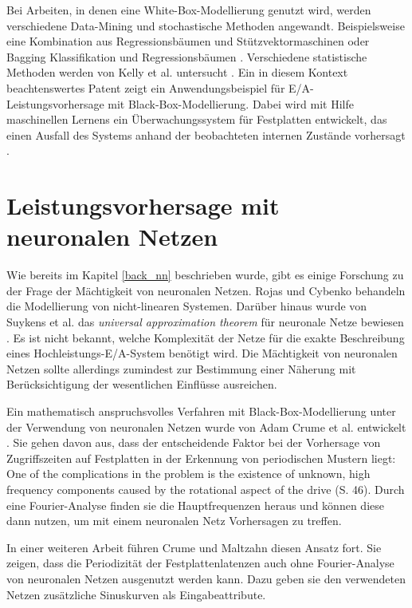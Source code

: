 \documentclass[
	twoside,
	12pt,
	a4paper,
	BCOR10mm,
	DIV14,
	listof=totoc,
	bibliography=totoc,
	headsepline
]{scrreprt}
\begin{document}
Bei Arbeiten, in denen eine White-Box-Modellierung genutzt wird, werden verschiedene Data-Mining und stochastische Methoden angewandt. Beispielsweise eine Kombination aus Regressionsbäumen und Stützvektormaschinen \cite{Dai:2012:SDP:2477169.2477214} oder Bagging Klassifikation und Regressionsbäumen \cite{DBLP:conf/npc/ZhangLZJC10}. Verschiedene statistische Methoden werden von Kelly et al. untersucht \cite{Kelly04inducingmodels}.
Ein in diesem Kontext beachtenswertes Patent zeigt ein Anwendungsbeispiel für E/A-Leistungsvorhersage mit Black-Box-Modellierung. Dabei wird mit Hilfe maschinellen Lernens ein Überwachungssystem für Festplatten entwickelt, das einen Ausfall des Systems anhand der beobachteten internen Zustände vorhersagt \cite{gough2012predicting}. 

\section{Leistungsvorhersage mit neuronalen Netzen}
\label{rel_vorhersage-mit-nn}
Wie bereits im Kapitel \ref{back_nn} beschrieben wurde, gibt es einige Forschung zu der Frage der Mächtigkeit von neuronalen Netzen. Rojas \cite{Rojas:1996:NNS:235222} und  Cybenko \cite{cybenko:mcss} behandeln die Modellierung von nicht-linearen Systemen. Darüber hinaus wurde von Suykens et al. das \textit{universal approximation theorem} für neuronale Netze bewiesen \cite{suykens2012artificial}. Es ist nicht bekannt, welche Komplexität der Netze für die exakte Beschreibung eines Hochleistungs-E/A-System benötigt wird. Die Mächtigkeit von neuronalen Netzen sollte allerdings zumindest zur Bestimmung einer Näherung mit Berücksichtigung der wesentlichen Einflüsse ausreichen.

Ein mathematisch anspruchsvolles Verfahren mit Black-Box-Modellierung unter der Verwendung von neuronalen Netzen wurde von Adam Crume et al. entwickelt \cite{Crume:2013:FML:2538542.2538561}. Sie gehen davon aus, dass der entscheidende Faktor bei der Vorhersage von Zugriffszeiten auf Festplatten in der Erkennung von periodischen Mustern liegt: \glqq One of the complications in the problem is the existence of unknown, high frequency components caused by the rotational aspect of the drive\grqq{} \cite{Crume:2013:FML:2538542.2538561} (S. 46).
Durch eine Fourier-Analyse finden sie die Hauptfrequenzen heraus und können diese dann nutzen, um mit einem neuronalen Netz Vorhersagen zu treffen.

In einer weiteren Arbeit führen Crume und Maltzahn diesen Ansatz fort. Sie zeigen, dass die Periodizität der Festplattenlatenzen auch ohne Fourier-Analyse von neuronalen Netzen ausgenutzt werden kann. Dazu geben sie den verwendeten Netzen zusätzliche Sinuskurven als Eingabeattribute. \cite{adamcrumecarlosmaltzahn2015}
\end{document}
